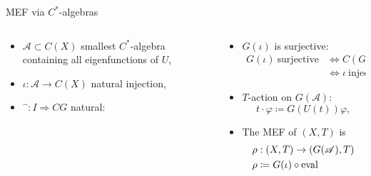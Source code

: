 \begin{frame}[fragile]{MEF via $C^*$-algebras}
  \begin{columns}[t]
    \begin{column}{0.5\textwidth}
     \begin{itemize}
    \item $\mathscr{A}\subset C(X)$ smallest $C^*$-algebra containing all eigenfunctions of $U$,
    \item $\iota : \mathscr{A} \to C(X)$ natural injection,
      \pause
    \item $\widehat{\phantom{a}}: I \Rightarrow CG$ natural:
     \end{itemize}
    \end{column}
    \begin{column}{0.5 \textwidth}
 \begin{itemize}
     \pause
   \item $G(\iota)$ is surjective:
  \begin{equation*}
        \begin{split}
          G(\iota) \ \text{surjective} &\Leftrightarrow C (G( \iota )) \ \text{injective} \\
          &\Leftrightarrow \iota \ \text{injective}
        \end{split}
              \end{equation*}
              \pause
   \item $T$-action on $G(\mathscr{A})$:
      \begin{equation*}
      t\cdot \varphi \coloneq G(U(t))\varphi,
      \end{equation*}
    \item The MEF of $(X,T)$ is
      \begin{equation*}
        \begin{split}
          &\rho : (X,T) \to (G(\mathscr{A}),T)\\ 
          &\rho\coloneq G(\iota) \circ \operatorname{eval}
        \end{split}
      \end{equation*}
   \end{itemize}
    \end{column}
  \end{columns}
  \end{frame}
